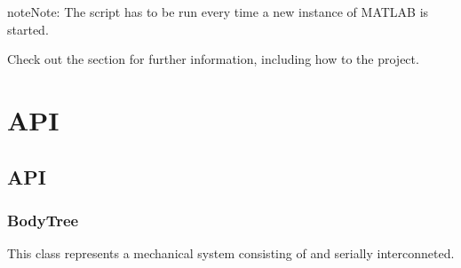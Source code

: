 \documentclass[letterpaper,10pt,english]{sphinxmanual}
\begin{document}
\begin{sphinxadmonition}{note}{Note:}
\sphinxAtStartPar
The script has to be run every time a new instance of MATLAB is started.
\end{sphinxadmonition}

\sphinxAtStartPar
Check out the {\hyperref[\detokenize{usage::doc}]{}} section for further information, including how to
{\hyperref[\detokenize{usage:installation}]{}} the project.


\chapter{API}
\label{\detokenize{index:api}}
\sphinxstepscope


\section{API}
\label{\detokenize{api:api}}\label{\detokenize{api::doc}}
\sphinxstepscope


\subsection{BodyTree}
\label{\detokenize{bodytree:bodytree}}\label{\detokenize{bodytree::doc}}\label{\detokenize{bodytree:module-classes}}
\sphinxAtStartPar
This class represents a mechanical system consisting of {\hyperref[\detokenize{body:Body}]{}} and {\hyperref[\detokenize{joint:Joint}]{}} serially interconneted.
\end{document}
